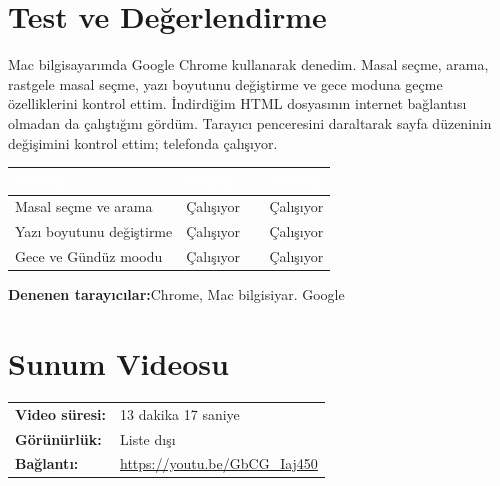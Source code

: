 \documentclass[12pt,a4paper]{article}
\begin{document}
\section{Test ve Değerlendirme}
 Mac bilgisayarımda Google Chrome kullanarak denedim. Masal seçme, arama, rastgele masal seçme, yazı boyutunu değiştirme ve gece moduna geçme özelliklerini kontrol ettim. İndirdiğim HTML dosyasının internet bağlantısı olmadan da çalıştığını gördüm. Tarayıcı penceresini daraltarak sayfa düzeninin değişimini kontrol ettim; telefonda çalışıyor.

\begin{center}
\begin{tabular}{@{}p{6cm}p{3.4cm}p{3.4cm}@{}}
\toprule
\rowcolor{ana}\textcolor{white}{\textbf{Özellik}} & \textcolor{white}{\textbf{Bilgisayar}} & \textcolor{white}{\textbf{Telefon}} \\
\midrule
\relax Masal seçme ve arama  & Çalışıyor  & Çalışıyor \\
\relax Yazı boyutunu değiştirme  & Çalışıyor  & Çalışıyor\\
\relax Gece ve Gündüz moodu & Çalışıyor  & Çalışıyor \\
\bottomrule
\end{tabular}
\end{center}

\textbf{Denenen tarayıcılar:}Chrome, Mac bilgisiyar. Google

\section{Sunum Videosu}
\begin{center}
\begin{tabular}{@{}ll@{}}
\textbf{Video süresi:} & 13 dakika 17 saniye \tabularnewline

\textbf{Görünürlük:} & Liste dışı \tabularnewline
\textbf{Bağlantı:} & \url{https://youtu.be/GbCG_Iaj450}
\tabularnewline
\end{tabular}
\end{center}
\end{document}
